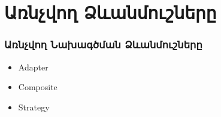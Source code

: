 \documentclass{beamer}
\begin{document}
\section{Առնչվող Ձևանմուշները}
\begin{frame}\frametitle{Առնչվող Նախագծման Ձևանմուշները}
\begin{itemize}
    \item Adapter \vfill
    \item Composite \vfill
    \item Strategy
\end{itemize}
\end{frame}
\end{document}
